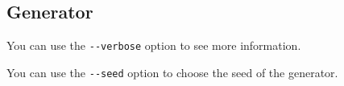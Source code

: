 \subsection{Generator}


You can use the \verb#--verbose# option to see more information.

You can use the \verb#--seed# option to choose the seed of the generator.